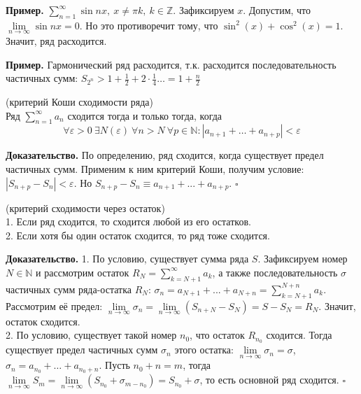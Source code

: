 \textbf{Пример.} $\sum\limits_{n=1}^{\infty} \sin{nx},~x\ne\pi k,~k 
\in\mathbb{Z}$. 
Зафиксируем $x$. Допустим, что $\lim\limits_{n \to \infty}\sin nx=0 $. 
Но это противоречит тому, что $\sin^2(x)+\cos^2(x)=1$. Значит, ряд расходится.

\textbf{Пример.} Гармонический ряд расходится, т.к. расходится 
последовательность частичных сумм: 
$S_{2^n}>1+\frac{1}{2}+2\cdot \frac{1}{4}\ldots=1+\frac{n}{2}$
\begin{theor} (критерий Коши сходимости ряда)\\
Ряд $\sum\limits_{n=1}^{\infty} a_n$ сходится тогда и только тогда, когда
$$\forall\varepsilon>0~\exists N(\varepsilon)~\forall n>N~\forall p\in
\mathbb{N}:|a_{n+1}+\ldots+a_{n+p}|<\varepsilon$$
\end{theor}
\textbf{Доказательство.} По определению, ряд сходится, когда существует предел
частичных сумм. Применим к ним критерий Коши, получим условие: 
$|S_{n+p}-S_n|<\varepsilon$. Но $S_{n+p}-S_n\equiv a_{n+1}+...+a_{n+p}$.
$\square$ 
\begin{theor} (критерий сходимости через остаток)\\
    1. Если ряд сходится, то сходится любой из его остатков.\\
    2. Если хотя бы один остаток сходится, то ряд тоже сходится.
\end{theor}
\textbf{Доказательство.}
1. По условию, существует сумма ряда $S$. Зафиксируем номер $N\in\mathbb{N}$ и 
рассмотрим остаток $R_N=\sum\limits_{k=N+1}^{\infty} a_k$, а также 
последовательность $\sigma$ частичных сумм ряда-остатка $R_N$: 
$\sigma_n=a_{N+1}+...+a_{N+n}=\sum\limits_{k=N+1}^{N+n} a_k$.
Рассмотрим её предел:
$\lim\limits_{n \to \infty} \sigma_n=\lim\limits_{n \to \infty}(S_{n+N}-S_N)
=S-S_N=R_N$. Значит, остаток сходится.\\
2. По условию, существует такой номер $n_0$, что остаток $R_{n_0}$ сходится.
Тогда существует предел частичных сумм $\sigma_n$ этого остатка:
$\lim\limits_{n \to \infty}\sigma_n=\sigma$, 
$\sigma_n=a_{n_0}+\ldots+a_{n_0+n}$. Пусть $n_0+n=m$, тогда
$\lim\limits_{n \to \infty}S_m=\lim\limits_{n \to \infty}
(S_{n_0}+\sigma_{m-n_0})=S_{n_0}+\sigma$, то есть основной ряд сходится.
$\square$ 








